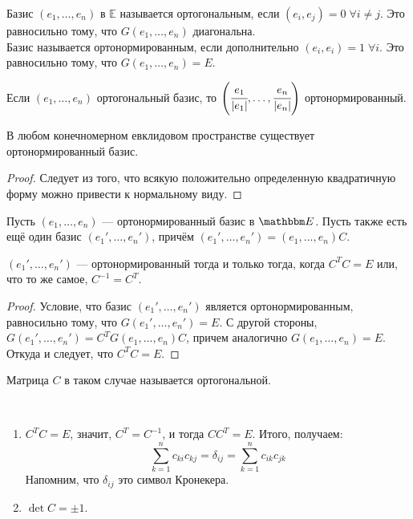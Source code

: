 \begin{Def}
	Базис $(e_1, \ldots, e_n)$ в $\mathbb{E}$ называется ортогональным, если $(e_i, e_j) = 0\; \forall i\neq j$. Это равносильно тому, что $G(e_1, \ldots, e_n)$ диагональна. \\Базис называется ортонормированным, если дополнительно $(e_i, e_i) = 1\; \forall i$. Это равносильно тому, что $G(e_1, \ldots, e_n) = E$.
\end{Def}
\begin{Comment}
	Если $(e_1,\ldots, e_n)$ ортогональный базис, то $\left(\cfrac{e_1}{|e_1|}, \ldots, \cfrac{e_n}{|e_n|}\right)$ ортонормированный.
\end{Comment}
\begin{Theorem}
	В любом конечномерном евклидовом пространстве существует ортонормированный базис.
\end{Theorem}
\begin{proof}
	Следует из того, что всякую положительно определенную квадратичную форму можно привести к нормальному виду. 
\end{proof}
Пусть $(e_1, \ldots, e_n)$ --- ортонормированный базис в $\E$. Пусть также есть ещё один базис $(e_1', \ldots, e_n')$, причём $(e_1', \ldots, e_n') = (e_1, \ldots, e_n)C$. 
\begin{Suggestion}
	$(e_1', \ldots, e_n')$ --- ортонормированный тогда и только тогда, когда $C^TC = E$ или, что то же самое, $C^{-1} = C^T$.
\end{Suggestion}
\begin{proof}
	Условие, что базис $(e_1', \ldots, e_n')$ является ортонормированным, равносильно тому, что $G(e_1', \ldots, e_n') = E$. С другой стороны, $G(e_1', \ldots, e_n') = C^TG(e_1, \ldots, e_n)C$, причем аналогично $G(e_1, \ldots, e_n) = E$. Откуда и следует, что $C^TC = E$.
\end{proof}
\begin{Def}
	Матрица $C$ в таком случае называется ортогональной.
\end{Def}

\begin{Properties}\
\begin{enumerate}
\item $C^TC = E$, значит, $C^T = C^{-1}$, и тогда $CC^T = E$. Итого, получаем:
$$
\sum\limits_{k = 1}^{n}c_{ki}c_{kj} = \delta_{ij} = \sum\limits_{k = 1}^{n}c_{ik}c_{jk}
$$
Напомним, что $\delta_{ij}$ это символ Кронекера.
\item $\det C = \pm 1$.
\end{enumerate}
\end{Properties}

